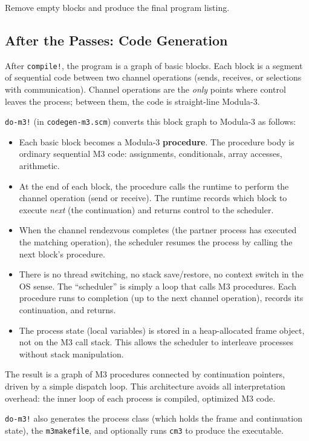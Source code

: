 \documentclass[11pt,letterpaper]{article}
\begin{document}
Remove empty blocks and produce the final program listing.

\subsection{After the Passes: Code Generation}

After \texttt{compile!}, the program is a graph of basic blocks.
Each block is a segment of sequential code between two channel
operations (sends, receives, or selections with communication).
Channel operations are the \emph{only} points where control
leaves the process; between them, the code is straight-line
Modula-3.

\texttt{do-m3!} (in \texttt{codegen-m3.scm}) converts this block
graph to Modula-3 as follows:

\begin{itemize}[nosep]
\item Each basic block becomes a Modula-3 \textbf{procedure}.  The
  procedure body is ordinary sequential M3 code: assignments,
  conditionals, array accesses, arithmetic.
\item At the end of each block, the procedure calls the runtime to
  perform the channel operation (send or receive).  The runtime
  records which block to execute \emph{next} (the continuation)
  and returns control to the scheduler.
\item When the channel rendezvous completes (the partner process has
  executed the matching operation), the scheduler resumes the
  process by calling the next block's procedure.
\item There is no thread switching, no stack save/restore, no
  context switch in the OS sense.  The ``scheduler'' is simply a
  loop that calls M3 procedures.  Each procedure runs to
  completion (up to the next channel operation), records its
  continuation, and returns.
\item The process state (local variables) is stored in a
  heap-allocated frame object, not on the M3 call stack.  This
  allows the scheduler to interleave processes without stack
  manipulation.
\end{itemize}

The result is a graph of M3 procedures connected by continuation
pointers, driven by a simple dispatch loop.  This architecture
avoids all interpretation overhead: the inner loop of each process
is compiled, optimized M3 code.

\texttt{do-m3!} also generates the process class (which holds the
frame and continuation state), the \texttt{m3makefile}, and
optionally runs \texttt{cm3} to produce the executable.
\end{document}
